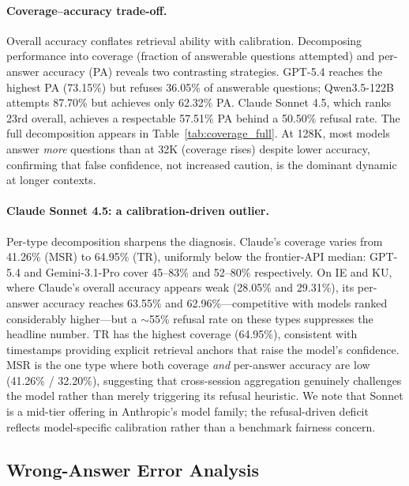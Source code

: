 \documentclass{article}
\begin{document}
\paragraph{Coverage--accuracy trade-off.}
\label{app:coverage_analysis}

Overall accuracy conflates retrieval ability with calibration. Decomposing performance into coverage (fraction of answerable questions attempted) and per-answer accuracy (PA) reveals two contrasting strategies. GPT-5.4 reaches the highest PA (73.15\%) but refuses 36.05\% of answerable questions; Qwen3.5-122B attempts 87.70\% but achieves only 62.32\% PA. Claude Sonnet 4.5, which ranks 23rd overall, achieves a respectable 57.51\% PA behind a 50.50\% refusal rate. The full decomposition appears in Table~\ref{tab:coverage_full}. At 128K, most models answer \emph{more} questions than at 32K (coverage rises) despite lower accuracy, confirming that false confidence, not increased caution, is the dominant dynamic at longer contexts.

\paragraph{Claude Sonnet 4.5: a calibration-driven outlier.}
Per-type decomposition sharpens the diagnosis. Claude's coverage varies from 41.26\% (MSR) to 64.95\% (TR), uniformly below the frontier-API median: GPT-5.4 and Gemini-3.1-Pro cover 45--83\% and 52--80\% respectively. On IE and KU, where Claude's overall accuracy appears weak (28.05\% and 29.31\%), its per-answer accuracy reaches 63.55\% and 62.96\%---competitive with models ranked considerably higher---but a ${\sim}$55\% refusal rate on these types suppresses the headline number. TR has the highest coverage (64.95\%), consistent with timestamps providing explicit retrieval anchors that raise the model's confidence. MSR is the one type where both coverage \emph{and} per-answer accuracy are low (41.26\% / 32.20\%), suggesting that cross-session aggregation genuinely challenges the model rather than merely triggering its refusal heuristic. We note that Sonnet is a mid-tier offering in Anthropic's model family; the refusal-driven deficit reflects model-specific calibration rather than a benchmark fairness concern.


\subsection{Wrong-Answer Error Analysis}
\label{app:wrong_answer_taxonomy}
\end{document}
